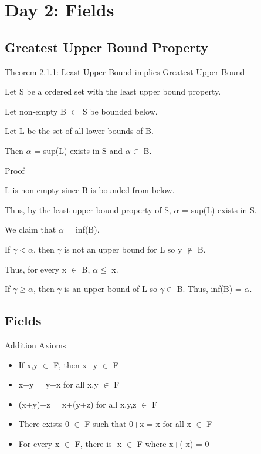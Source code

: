 \newpage
\section[Day 2: Fields]{Day 2: Fields}





\subsection{Greatest Upper Bound Property}

{ \color{red} Theorem 2.1.1: Least Upper Bound implies Greatest Upper Bound }

\begin{adjustbox}{minipage=14cm, right}
	Let S be a ordered set with the least upper bound property.

	Let non-empty B $\subset$ S be bounded below.

	Let L be the set of all lower bounds of B.

	Then $\alpha$ = sup(L) exists in S and $\alpha \in$ B.
\end{adjustbox}

{ \color{magenta} Proof }

L is non-empty since B is bounded from below.

Thus, by the least upper bound property of S, $\alpha$ = sup(L) exists in S.

We claim that $\alpha$ = inf(B).

If $\gamma < \alpha$, then $\gamma$ is not an upper bound for L so y $\not \in$ B.

Thus, for every x $\in$ B, $\alpha \leq$ x.

If $\gamma \geq \alpha$, then $\gamma$ is an upper bound of L so $\gamma \in$ B.
Thus, inf(B) = $\alpha$.





\subsection{Fields}

Addition Axioms
\begin{itemize}[leftmargin=2cm]
	\item If x,y $\in$ F, then x+y $\in$ F
	
	\item x+y = y+x for all x,y $\in$ F
	
	\item (x+y)+z = x+(y+z) for all x,y,z $\in$ F
	
	\item There exists 0 $\in$ F such that 0+x = x for all x $\in$ F
	
	\item For every x $\in$ F, there is -x $\in$ F where x+(-x) = 0
\end{itemize}

